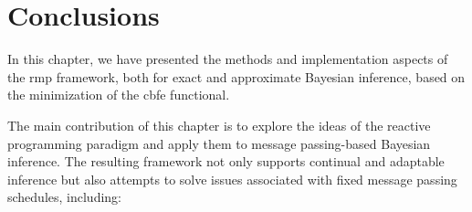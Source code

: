 \section{Conclusions}\label{chapter-03:section:conclusion}

In this chapter, we have presented the methods and implementation aspects of the \ac{rmp} framework, both for exact and approximate Bayesian inference, based on the minimization of the \ac{cbfe} functional.

The main contribution of this chapter is to explore the ideas of the reactive programming
paradigm and apply them to message passing-based Bayesian inference.
The resulting framework not only supports continual and adaptable inference but also attempts
to solve issues associated with fixed message passing schedules, including:

